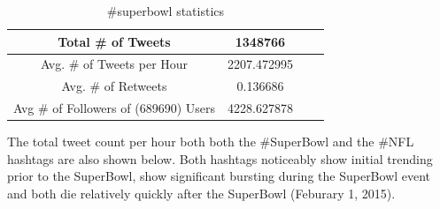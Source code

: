 \documentclass[12pt]{article}
\begin{document}
\begin{table}[!h]
	\centering
	\begin{tabular}{| c | c | c | c |}
		\hline 
		Total \# of Tweets & 1348766 \\\hline
		Avg. \# of Tweets per Hour & 2207.472995 \\\hline
		Avg. \# of Retweets & 0.136686 \\\hline
		Avg \# of Followers of (689690) Users & 4228.627878 \\\hline
	\end{tabular} 
	\caption{\#superbowl statistics}
	\label{part1:tab1}
\end{table} 


The total tweet count per hour both both the \#SuperBowl and the \#NFL hashtags are also shown below. Both hashtags noticeably show initial trending prior to the SuperBowl, show significant bursting during the SuperBowl event and both die relatively quickly after the SuperBowl (Feburary 1, 2015).
\end{document}
